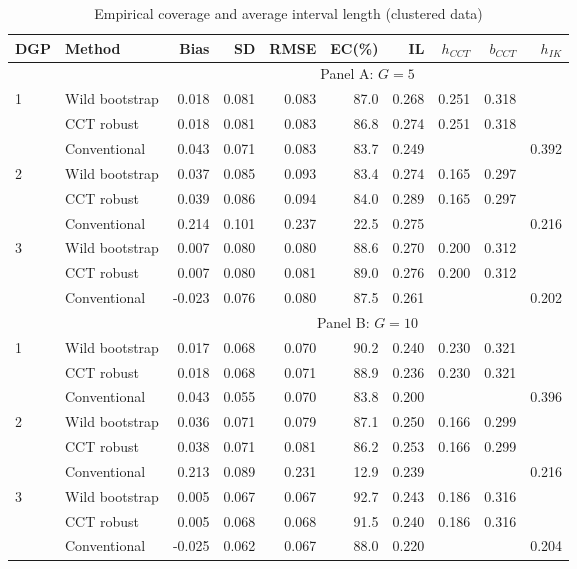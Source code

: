\documentclass[12pt,]{article}
\DeclareMathOperator{\1}{\mathbbm{1}}
\begin{document}
\begin{table}
	\begin{threeparttable}
		\caption{Empirical coverage and average interval length (clustered data)}
		\label{tb: cluster simulation}
		\begin{tabular}{llrrrrrrrr}
			\hline
			DGP & Method & Bias & SD & RMSE & EC(\%) & IL & $h_{CCT}$ & $b_{CCT}$ & $h_{IK}$ \\ 
			\hline
			&& \multicolumn{8}{c}{Panel A: $G = 5$} \\ \cline{3-10}
			1 & Wild bootstrap & 0.018 & 0.081 & 0.083 & 87.0 & 0.268 & 0.251 & 0.318 &  \\ 
			& CCT robust & 0.018 & 0.081 & 0.083 & 86.8 & 0.274 & 0.251 & 0.318 &  \\ 
			& Conventional & 0.043 & 0.071 & 0.083 & 83.7 & 0.249 &  &  & 0.392 \\ 
			2 & Wild bootstrap & 0.037 & 0.085 & 0.093 & 83.4 & 0.274 & 0.165 & 0.297 &  \\ 
			& CCT robust & 0.039 & 0.086 & 0.094 & 84.0 & 0.289 & 0.165 & 0.297 &  \\ 
			& Conventional & 0.214 & 0.101 & 0.237 & 22.5 & 0.275 &  &  & 0.216 \\ 
			3 & Wild bootstrap & 0.007 & 0.080 & 0.080 & 88.6 & 0.270 & 0.200 & 0.312 &  \\ 
			& CCT robust & 0.007 & 0.080 & 0.081 & 89.0 & 0.276 & 0.200 & 0.312 &  \\ 
			& Conventional & -0.023 & 0.076 & 0.080 & 87.5 & 0.261 &  &  & 0.202 \\ 
			
			&& \multicolumn{8}{c}{Panel B: $G = 10$} \\ \cline{3-10}
			1 & Wild bootstrap & 0.017 & 0.068 & 0.070 & 90.2 & 0.240 & 0.230 & 0.321 &  \\ 
			& CCT robust & 0.018 & 0.068 & 0.071 & 88.9 & 0.236 & 0.230 & 0.321 &  \\ 
			& Conventional & 0.043 & 0.055 & 0.070 & 83.8 & 0.200 &  &  & 0.396 \\ 
			2 & Wild bootstrap & 0.036 & 0.071 & 0.079 & 87.1 & 0.250 & 0.166 & 0.299 &  \\ 
			& CCT robust & 0.038 & 0.071 & 0.081 & 86.2 & 0.253 & 0.166 & 0.299 &  \\ 
			& Conventional & 0.213 & 0.089 & 0.231 & 12.9 & 0.239 &  &  & 0.216 \\ 
			3 & Wild bootstrap & 0.005 & 0.067 & 0.067 & 92.7 & 0.243 & 0.186 & 0.316 &  \\ 
			& CCT robust & 0.005 & 0.068 & 0.068 & 91.5 & 0.240 & 0.186 & 0.316 &  \\ 
			& Conventional & -0.025 & 0.062 & 0.067 & 88.0 & 0.220 &  &  & 0.204 \\ 
			

\end{tabular}
\end{threeparttable}
\end{table}
\end{document}
